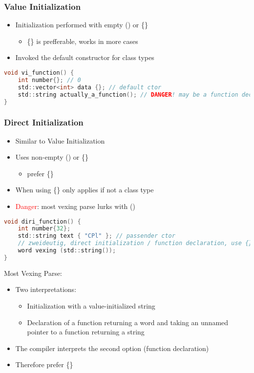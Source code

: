 \subsubsection{Value Initialization}
\begin{itemize}
    \item Initialization performed with empty () or \{\}
    \begin{itemize}
        \item \{\} is prefferable, works in more cases
    \end{itemize}
    \item Invoked the default constructor for class types
\end{itemize}

\begin{lstlisting}[style=frame, style= linenumbers, language=C]
void vi_function() {
    int number{}; // 0
    std::vector<int> data {}; // default ctor
    std::string actually_a_function(); // DANGER! may be a function declaration, use {}
}
\end{lstlisting}

\subsubsection{Direct Initialization}
\begin{itemize}
    \item Similar to Value Initialization
    \item Uses non-empty () or \{\}
    \begin{itemize}
        \item prefer \{\}
    \end{itemize}
    \item When using \{\} only applies if not a class type
    \item \textcolor{red}{Danger}: most vexing parse lurks with ()
\end{itemize}

\begin{lstlisting}[style=frame, style= linenumbers, language=C]
void diri_function() {
    int number{32};
    std::string text { "CPl" }; // passender ctor
    // zweideutig, direct initialization / function declaration, use {}
    word vexing (std::string());
}
\end{lstlisting}

\pagebreak

Most Vexing Parse:
\begin{itemize}
    \item Two interpretations:
    \begin{itemize}
        \item Initialization with a value-initialized string
        \item Declaration of a function returning a word and taking an unnamed pointer to a function returning a string
    \end{itemize}
    \item The compiler interprets the second option (function declaration)
    \item Therefore prefer \{\}
\end{itemize}

